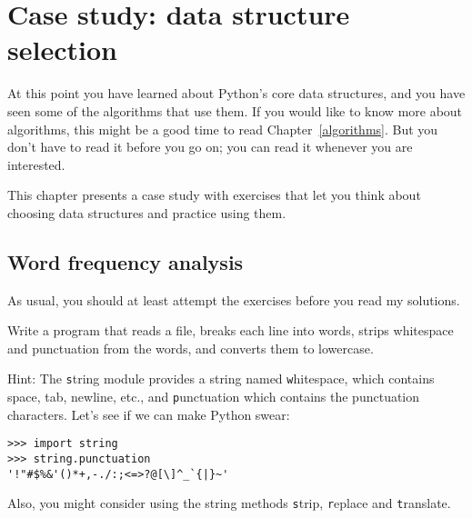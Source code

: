 \documentclass[
DIV=11,
fontsize=13,
twoside,
headinclude=false,
titlepage=firstiscover,
abstract=true,
headsepline=true,
footsepline=true,
chapterprefix=true, %
headings=big,
bibliography=totoc,%
captions=tableheading
]{scrbook}
\theoremstyle{definition}
\begin{document}
\normalfont




\chapter{Case study: data structure selection}

At this point you have learned about Python's core data structures,
and you have seen some of the algorithms that use them.
If you would like to know more about algorithms, this might be a good
time to read Chapter~\ref{algorithms}.
But you don't have to read it before you go on; you can read
it whenever you are interested.

This chapter presents a case study with exercises that let
you think about choosing data structures and practice using them.


\section{Word frequency analysis}
\label{analysis}

As usual, you should at least attempt the exercises
before you read my solutions.

\begin{exercise}
\normalfont

Write a program that reads a file, breaks each line into
words, strips whitespace and punctuation from the words, and
converts them to lowercase.

Hint: The {\texttt string} module provides a string named {\texttt whitespace},
which contains space, tab, newline, etc., and {\texttt
  punctuation} which contains the punctuation characters.  Let's see
if we can make Python swear:

\begin{lstlisting}
>>> import string
>>> string.punctuation
'!"#$%&'()*+,-./:;<=>?@[\]^_`{|}~'
\end{lstlisting}
%
Also, you might consider using the string methods {\texttt strip},
{\texttt replace} and {\texttt translate}.

\end{exercise}
\end{document}
